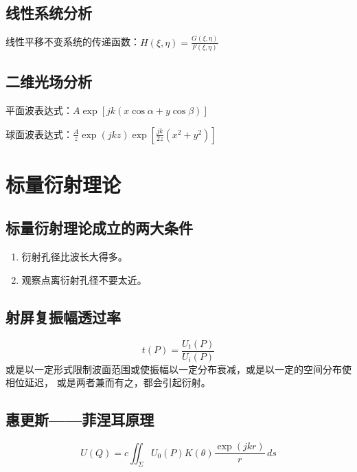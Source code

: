 \documentclass[twocolumn]{ctexart}
\begin{document}
\subsection{线性系统分析}
线性平移不变系统的传递函数：$H\left(\xi ,\eta \right)=\frac{G\left(\xi ,\eta \right)}{F\left(\xi ,\eta \right)}$
\subsection{二维光场分析}
平面波表达式：$A\exp \left[jk\left(x\cos \alpha +y\cos \beta\right)\right]$
\par
球面波表达式：$\frac{A}{z}\exp \left(jkz\right)\exp \left[\frac{jk}{2z}\left(x^2+y^2\right)\right]$

\section{标量衍射理论}
\subsection{标量衍射理论成立的两大条件}
\begin{enumerate}
    \item 衍射孔径比波长大得多。
    \item 观察点离衍射孔径不要太近。
\end{enumerate}

\subsection{射屏复振幅透过率}
\begin{equation}
    t\left(P\right)=\frac{U_t(P)}{U_i(P)} \nonumber
\end{equation}
或是以一定形式限制波面范围或使振幅以一定分布衰减，或是以一定的空间分布使相位延迟，
或是两者兼而有之，都会引起衍射。
\subsection{惠更斯——菲涅耳原理}
\begin{equation}
    U\left(Q\right)=c\iint _{\Sigma} U_0\left(P\right)K\left(\theta \right)\frac{\exp \left(jkr\right)}{r}\,ds \nonumber
\end{equation}
\end{document}
